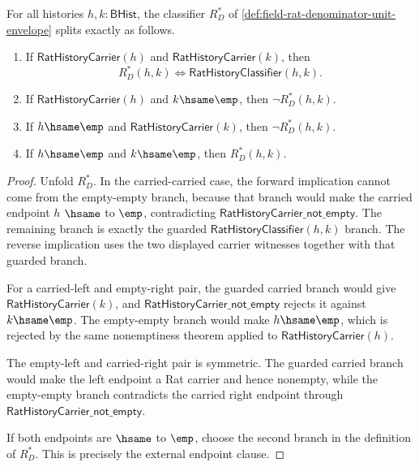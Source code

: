 \begin{theorem}
\label{thm:field-rat-denominator-unit-envelope-classifier-exactness}
For all histories $h,k:\mathsf{BHist}$, the classifier $R_D^\ast$ of
\autoref{def:field-rat-denominator-unit-envelope} splits exactly as follows.
\begin{enumerate}
  \item If $\mathsf{RatHistoryCarrier}(h)$ and
  $\mathsf{RatHistoryCarrier}(k)$, then
  $$
  R_D^\ast(h,k)\Longleftrightarrow
  \mathsf{RatHistoryClassifier}(h,k).
  $$
  \item If $\mathsf{RatHistoryCarrier}(h)$ and $k\hsame\emp$, then
  $\neg R_D^\ast(h,k)$.
  \item If $h\hsame\emp$ and $\mathsf{RatHistoryCarrier}(k)$, then
  $\neg R_D^\ast(h,k)$.
  \item If $h\hsame\emp$ and $k\hsame\emp$, then $R_D^\ast(h,k)$.
\end{enumerate}
\end{theorem}
\begin{proof}
Unfold $R_D^\ast$. In the carried-carried case, the forward implication cannot
come from the empty-empty branch, because that branch would make the carried
endpoint $h$ $\hsame$ to $\emp$, contradicting
$\mathsf{RatHistoryCarrier\_not\_empty}$. The remaining branch is exactly the
guarded $\mathsf{RatHistoryClassifier}(h,k)$ branch. The reverse implication
uses the two displayed carrier witnesses together with that guarded branch.

For a carried-left and empty-right pair, the guarded carried branch would give
$\mathsf{RatHistoryCarrier}(k)$, and
$\mathsf{RatHistoryCarrier\_not\_empty}$ rejects it against $k\hsame\emp$. The
empty-empty branch would make $h\hsame\emp$, which is rejected by the same
nonemptiness theorem applied to $\mathsf{RatHistoryCarrier}(h)$.

The empty-left and carried-right pair is symmetric. The guarded carried branch
would make the left endpoint a Rat carrier and hence nonempty, while the
empty-empty branch contradicts the carried right endpoint through
$\mathsf{RatHistoryCarrier\_not\_empty}$.

If both endpoints are $\hsame$ to $\emp$, choose the second branch in the
definition of $R_D^\ast$. This is precisely the external endpoint clause.
\end{proof}

